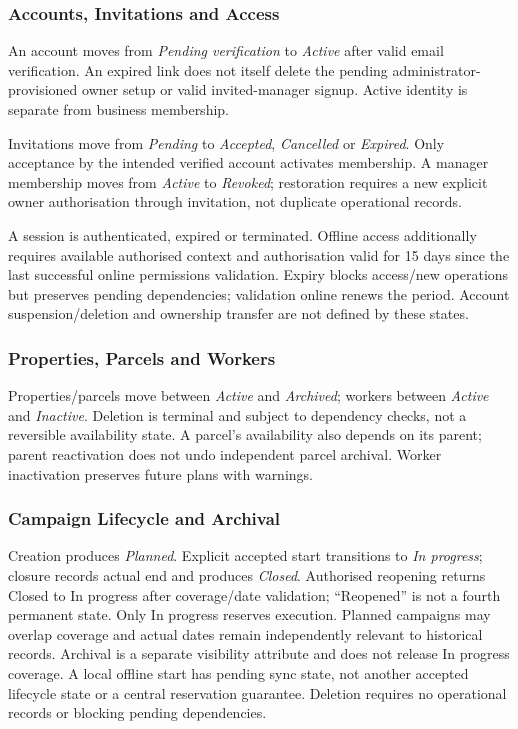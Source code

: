 \subsubsection{Accounts, Invitations and Access}
An account moves from \textit{Pending verification} to \textit{Active}
after valid email verification. An expired link does not itself delete
the pending administrator-provisioned owner setup or valid invited-manager signup. Active identity is separate from business membership.

Invitations move from \textit{Pending} to \textit{Accepted}, \textit{Cancelled}
or \textit{Expired}. Only acceptance by the intended verified account activates
membership. A manager membership moves from \textit{Active} to \textit{Revoked};
restoration requires a new explicit owner authorisation through invitation,
not duplicate operational records.

A session is authenticated, expired or terminated. Offline access additionally
requires available authorised context and authorisation valid for 15 days since
the last successful online permissions validation. Expiry blocks access/new
operations but preserves pending dependencies; validation online renews the period.
Account suspension/deletion and ownership transfer are not defined by these states.

\subsubsection{Properties, Parcels and Workers}
Properties/parcels move between \textit{Active} and \textit{Archived}; workers
between \textit{Active} and \textit{Inactive}. Deletion is terminal and subject
to dependency checks, not a reversible availability state. A parcel's availability
also depends on its parent; parent reactivation does not undo independent parcel archival.
Worker inactivation preserves future plans with warnings.

\subsubsection{Campaign Lifecycle and Archival}
Creation produces \textit{Planned}. Explicit accepted start transitions to
\textit{In progress}; closure records actual end and produces \textit{Closed}.
Authorised reopening returns Closed to In progress after coverage/date validation;
``Reopened'' is not a fourth permanent state. Only In progress reserves execution.
Planned campaigns may overlap coverage and actual dates remain independently
relevant to historical records. Archival is a separate visibility attribute and
does not release In progress coverage. A local offline start has pending sync state,
not another accepted lifecycle state or a central reservation guarantee.
Deletion requires no operational records or blocking pending dependencies.

